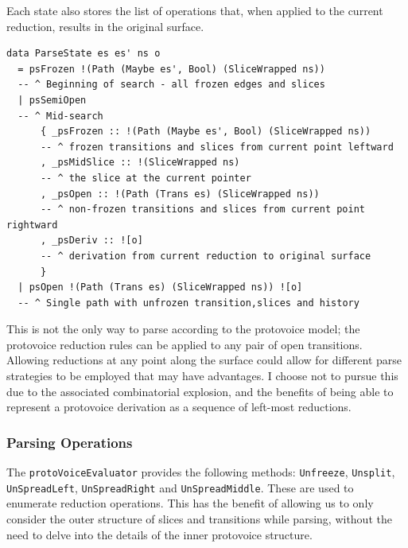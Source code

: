 \documentclass[12pt,a4paper,twoside,openright]{report}
\theoremstyle{definition}
\begin{document}
Each state also stores the list of operations that, when applied to the current reduction, results in the original surface. %

\begin{lstlisting}[caption={protovoiceEvaluator}, captionpos=b]
data ParseState es es' ns o
  = psFrozen !(Path (Maybe es', Bool) (SliceWrapped ns)) 
  -- ^ Beginning of search - all frozen edges and slices
  | psSemiOpen 
  -- ^ Mid-search
      { _psFrozen :: !(Path (Maybe es', Bool) (SliceWrapped ns))
      -- ^ frozen transitions and slices from current point leftward
      , _psMidSlice :: !(SliceWrapped ns)
      -- ^ the slice at the current pointer
      , _psOpen :: !(Path (Trans es) (SliceWrapped ns))
      -- ^ non-frozen transitions and slices from current point rightward
      , _psDeriv :: ![o]
      -- ^ derivation from current reduction to original surface
      }
  | psOpen !(Path (Trans es) (SliceWrapped ns)) ![o] 
  -- ^ Single path with unfrozen transition,slices and history
\end{lstlisting}

This is not the only way to parse according to the protovoice model; the protovoice reduction rules can be applied to any pair of open transitions.
Allowing reductions at any point along the surface could allow for different parse strategies to be employed that may have advantages.
I choose not to pursue this due to the associated combinatorial explosion, and the benefits of being able to represent a protovoice derivation as a sequence of left-most reductions.


\subsubsection{Parsing Operations}
The \texttt{protoVoiceEvaluator} \cite{finkensiepModelingInferringProtovoice2021} provides the following methods: \texttt{Unfreeze}, \texttt{Unsplit}, \texttt{UnSpreadLeft}, \texttt{UnSpreadRight} and \texttt{UnSpreadMiddle}. These are used to enumerate reduction operations. This has the benefit of allowing us to only consider the outer structure of slices and transitions while parsing, without the need to delve into the details of the inner protovoice structure.
\end{document}
